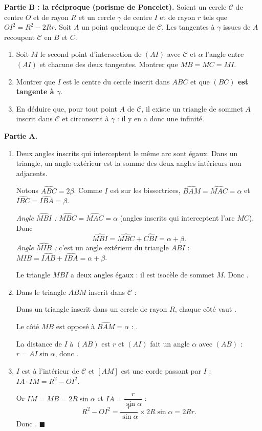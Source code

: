 \textbf{Partie B : la réciproque (porisme de Poncelet).}
Soient un cercle $\mathcal C$ de centre $O$ et de rayon $R$ et un cercle $\gamma$ de centre $I$ et de rayon $r$ tels que $OI^2=R^2-2Rr$. Soit $A$ un point quelconque de $\mathcal C$. Les tangentes à $\gamma$ issues de $A$ recoupent $\mathcal C$ en $B$ et $C$.
\begin{enumerate}
  \item Soit $M$ le second point d'intersection de $(AI)$ avec $\mathcal C$ et $\alpha$ l'angle entre $(AI)$ et chacune des deux tangentes. Montrer que $MB=MC=MI$.
  \item Montrer que $I$ est le centre du cercle inscrit dans $ABC$ et que \textbf{$(BC)$ est tangente à $\gamma$}.
  \item En déduire que, pour tout point $A$ de $\mathcal C$, il existe un triangle de sommet $A$ inscrit dans $\mathcal C$ et circonscrit à $\gamma$ : il y en a donc une infinité.
\end{enumerate}

\textbf{Partie A.}
\begin{enumerate}[itemsep=14pt]
  \item\leavevmode
  \begin{prop}
  Deux angles inscrits qui interceptent le même arc sont égaux. Dans un triangle, un angle extérieur est la somme des deux angles intérieurs non adjacents.
  \end{prop}
  Notons $\widehat{ABC}=2\beta$. Comme $I$ est sur les bissectrices, $\widehat{BAM}=\widehat{MAC}=\alpha$ et $\widehat{IBC}=\widehat{IBA}=\beta$.

  \emph{Angle $\widehat{MBI}$ :} $\widehat{MBC}=\widehat{MAC}=\alpha$ (angles inscrits qui interceptent l'arc $MC$). Donc
  \[\widehat{MBI}=\widehat{MBC}+\widehat{CBI}=\alpha+\beta.\]
  \emph{Angle $\widehat{MIB}$ :} c'est un angle extérieur du triangle $ABI$ : $\widehat{MIB}=\widehat{IAB}+\widehat{IBA}=\alpha+\beta$.

  Le triangle $MBI$ a deux angles égaux : il est isocèle de sommet $M$. Donc .

  \item Dans le triangle $ABM$ inscrit dans $\mathcal C$ :
  \begin{prop}
  Dans un triangle inscrit dans un cercle de rayon $R$, chaque côté vaut .
  \end{prop}
  Le côté $MB$ est opposé à $\widehat{BAM}=\alpha$ : .

  La distance de $I$ à $(AB)$ est $r$ et $(AI)$ fait un angle $\alpha$ avec $(AB)$ : $r=AI\sin\alpha$, donc .

  \item $I$ est à l'intérieur de $\mathcal C$ et $[AM]$ est une corde passant par $I$ : $IA\cdot IM=R^2-OI^2$.

  Or $IM=MB=2R\sin\alpha$ et $IA=\dfrac r{\sin\alpha}$ :
  \[R^2-OI^2=\dfrac r{\sin\alpha}\times2R\sin\alpha=2Rr.\]
  Donc . $\blacksquare$
\end{enumerate}

